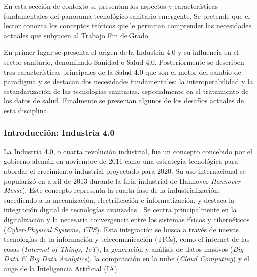 En esta sección de contexto se presentan los aspectos y características fundamentales del panorama tecnológico-sanitario emergente. Se pretende que el lector conozca los conceptos teóricos que le permitan comprender las necesidades actuales que subyacen al Trabajo Fin de Grado.
 

En primer lugar se presenta el origen de la Industria 4.0 y su influencia en el sector sanitario, denominado Sanidad o Salud 4.0. 
Posteriormente se describen tres características principales de la Salud 4.0 que son el motor del cambio de paradigma y se destacan dos necesidades fundamentales: la interoperabilidad y la estandarización de las tecnologías sanitarias, especialmente en el tratamiento de los datos de salud. Finalmente se presentan algunos de los desafíos actuales de esta disciplina.

\subsubsection{Introducción: Industria 4.0}

La Industria 4.0, o cuarta revolución industrial, fue un concepto concebido por el gobierno alemán en noviembre de 2011 como una estrategia tecnológica para abordar el crecimiento industrial proyectado para 2020. Su uso internacional se popularizó en abril de 2013 durante la feria industrial de Hannover \textit{Hannover Messe}). Este concepto representa la cuarta fase de la industrialización, sucediendo a la mecanización, electrificación e informatización, y destaca la integración digital de tecnologías avanzadas \cite{lasi2014industry}.
Se centra principalmente en la digitalización y la necesaria convergencia entre los sistemas físicos y cibernéticos (\textit{Cyber-Physical Systems, CPS}). Esta integración se busca a través de nuevas tecnologías de la información y telecomunicación (TICs), como el internet de las cosas (\textit{Internet of Things, IoT}), la generación y análisis de datos masivos (\textit{Big Data \& Big Data Analytics}), la computación en la nube (\textit{Cloud Computing}) y el auge de la Inteligencia Artificial (IA) \cite{lasi2014industry}\cite{chen2020times}\cite{tortorella2020healthcare}

